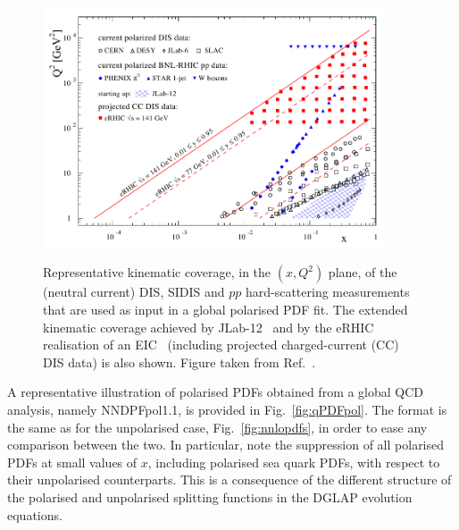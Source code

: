 \begin{figure}[!t]
\centering
\includegraphics[width=0.9\textwidth]{plots/kinEIC}\\
\caption{\small Representative kinematic coverage, in the $(x,Q^2)$ plane,
of the (neutral current) DIS, SIDIS and $pp$ hard-scattering measurements 
that are used as input in a global polarised PDF fit.
%
The extended kinematic coverage achieved by 
JLab-12~\cite{Dudek:2012vr} and by the eRHIC~\cite{Aschenauer:2014cki} 
realisation of an EIC~\cite{Accardi:2012qut}
(including projected charged-current (CC) DIS data) is also shown.
%
Figure taken from Ref.~\cite{Aschenauer:2014cki}.}
\label{fig:kinEIC}
\end{figure}

A representative illustration of polarised PDFs obtained from a global
QCD analysis, namely NNDPFpol1.1, is provided in Fig.~\ref{fig:qPDFpol}.
%
The format is the same as for the unpolarised case, Fig.~\ref{fig:nnlopdfs},
in order to ease any comparison between the two.
%
In particular, note the suppression of all polarised PDFs at small values of 
$x$, including polarised sea quark PDFs, with respect to their unpolarised 
counterparts.
%
This is a consequence of the different structure of the polarised and 
unpolarised splitting functions in the DGLAP evolution equations. 

